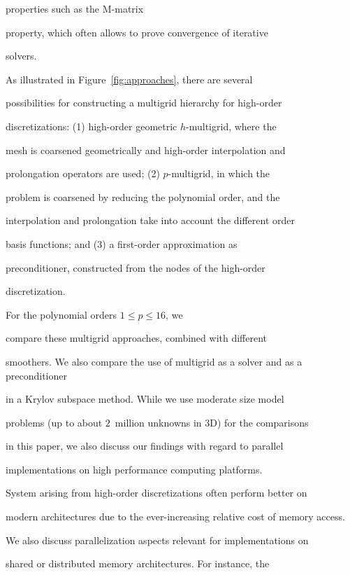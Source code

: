 \documentclass[smallcondensed,final]{svjour3}     %
\begin{document}
properties such as the M-matrix

property, which often allows to prove convergence of iterative

solvers.



As illustrated in Figure~\ref{fig:approaches}, there are several

possibilities for constructing a multigrid hierarchy for high-order

discretizations: (1) high-order geometric $h$-multigrid, where the

mesh is coarsened geometrically and high-order interpolation and

prolongation operators are used; (2) $p$-multigrid, in which the

problem is coarsened by reducing the polynomial order, and the

interpolation and prolongation take into account the different order

basis functions; and (3) a first-order approximation as

preconditioner, constructed from the nodes of the high-order

discretization.

For the polynomial orders $1\le p\le 16$, we

compare these multigrid approaches, combined with different

smoothers. We also compare the use of multigrid as a solver and as a preconditioner

in a Krylov subspace method.  While we use moderate size model

problems (up to about $2$~million unknowns in 3D) for the comparisons

in this paper, we also discuss our findings with regard to parallel

implementations on high performance computing platforms. 


System arising from high-order discretizations often perform better on 

modern architectures due to the ever-increasing relative cost of memory access.

We also discuss parallelization aspects relevant for implementations on

shared or distributed memory architectures. For instance, the
\end{document}
